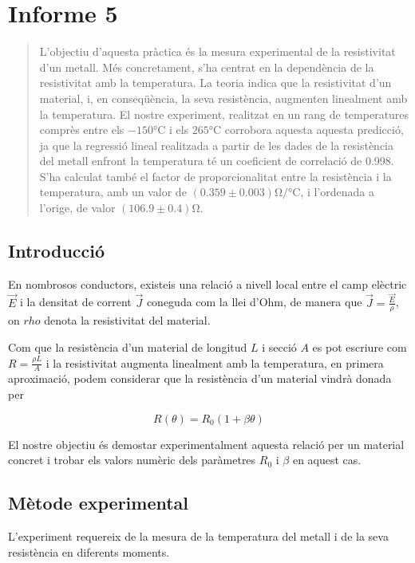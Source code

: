 
\chapter{Informe 5}
\begin{abstract}
	L'objectiu d'aquesta pràctica és la mesura experimental de la resistivitat d'un metall. Més concretament, s'ha centrat en la dependència de la resistivitat amb la temperatura. La teoria indica que la resistivitat d'un material, i, en conseqüència, la seva resistència, augmenten linealment amb la temperatura. El nostre experiment, realitzat en un rang de temperatures comprès entre els $-150\si{\celsius}$ i els $265\si{\celsius}$ corrobora aquesta aquesta predicció, ja que la regressió lineal realitzada a partir de les dades de la resistència del metall enfront la temperatura té un coeficient de correlació de 0.998. S'ha calculat també el factor de proporcionalitat entre la resistència i la temperatura, amb un valor de $(0.359\pm0.003)\si{\ohm\per\celsius}$, i l'ordenada a l'orige, de valor $(106.9\pm0.4)\si{\ohm}$.
\end{abstract}

\section{Introducció}
En nombrosos conductors, existeis una relació a nivell local entre el camp elèctric $\vec{E}$ i la densitat de corrent $\vec{J}$ coneguda com la llei d'Ohm, de manera que $\vec{J}=\frac{\vec{E}}{\rho}$, on $rho$ denota la resistivitat del material.

Com que la resistència d'un material de longitud $L$ i secció $A$ es pot escriure com $R=\frac{\rho L}{A}$ i la resistivitat augmenta linealment amb la temperatura, en primera aproximació, podem considerar que la resistència d'un material vindrà donada per 

\begin{equation} \label{eq: <regressio>}
R(\theta)=R_0(1+\beta\theta)
\end{equation}

El nostre objectiu és demostar experimentalment aquesta relació per un material concret i trobar els valors numèric dels paràmetres $R_0$ i $\beta$ en aquest cas.

\section{Mètode experimental}

L'experiment requereix de la mesura de la temperatura del metall i de la seva resistència en diferents moments.


